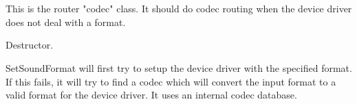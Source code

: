 %
%


\section{}\label{wxsoundrouterstream}

This is the router "codec" class. It should do codec routing when the device
driver does not deal with a format.





\label{wxsoundrouterstreamwxsoundrouterstream}



\label{wxsoundrouterstreamdtor}

Destructor.

\label{wxsoundrouterstreamsetsoundformat}

SetSoundFormat will first try to setup the device driver with the specified
format. If this fails, it will try to find a codec which will convert the
input format to a valid format for the device driver. It uses an internal
codec database.
